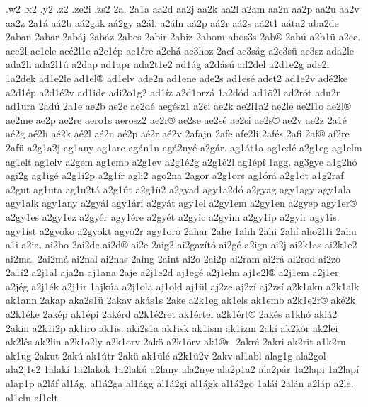 {.w2
.x2
.y2
.z2
.ze2i
.zs2
2a.
2a1a
aa2d
aa2j
aa2k
aa2l
a2am
aa2n
aa2p
aa2u
aa2v
aa2z
2a1^^e1
a^^e12b
a^^e12gak
a^^e12gy
a2^^e1l.
a2^^e1ln
a^^e12p
a^^e12r
a^^e12s
a^^e12t1
a^^e1ta2
aba2de
2aban
2abar
2ab^^e1j
2ab^^e1z
2abes
2abir
2abiz
2abom
abos3s
2ab^^ae
2ab^^fa
a2b1^^fc
a2ce.
ace2l
ac1ele
ac^^e92l1e
a2c1^^e9p
ac1^^e9re
a2ch^^e1
ac3hoz
2ac^^ed
ac3s^^e1g
a2c3s^^fc
ac3sz
ada2le
ada2li
ada2l1^^fa
a2dap
ad1apr
ada2t1e2
ad1^^e1g
a2d^^e1s^^fa
ad2del
a2d1e2g
ade2i
1a2dek
ad1e2le
ad1el^^ae
ad1elv
ade2n
ad1ene
ade2s
ad1es^^e9
adet2
ad1e2v
ad^^e92ke
a2d1^^e9p
a2d1^^e92v
ad1ide
adi2o1g2
ad1^^edz
a2d1orz^^e1
1a2d^^f3d
ad1^^f62l
ad2r^^f3t
adu2r
ad1ura
2ad^^fa
2a1e
ae2b
ae2c
ae2d^^e9
aeg^^e9sz1
a2ei
ae2k
ae2l1a2
ae2le
ae2l1o
ae2l^^ae
ae2me
ae2p
ae2re
aero1s
aerosz2
ae2r^^ae
ae2se
ae2s^^e9
ae2si
ae2s^^ae
ae2v
ae2z
2a1^^e9
a^^e92g
a^^e92h
a^^e92k
a^^e92l
a^^e92n
a^^e92p
a^^e92r
a^^e92v
2afajn
2afe
afe2li
2af^^e9s
2afi
2af^^ae
af2re
2af^^fc
a2g1a2j
ag1any
ag1arc
ag^^e1n1n
ag^^e12ny^^e9
a2g^^e1r.
ag1^^e1t1a
ag1ed^^e9
a2g1eg
ag1elm
ag1elt
ag1elv
a2gem
ag1emb
a2g1ev
a2g1^^e92g
a2g1^^e92l
ag1^^e9p^^ed
1agg.
ag3gye
a1g2h^^f3
agi2g
ag1ig^^e9
a2g1i2p
a2g1^^edr
agli2
ago2na
2agor
a2g1ors
ag1^^f3r^^e1
a2g1^^f6t
a1g2raf
a2gut
ag1uta
ag1u2t^^e1
a2g1^^fat
a2g1^^fc2
a2gyad
agy1a2d^^f3
a2gyag
agy1agy
agy1ala
agy1alk
agy1any
a2gy^^e1l
agy1^^e1ri
a2gy^^e1t
agy1el
a2gy1em
a2gy1en
a2gyep
agy1er^^ae
a2gy1es
a2gy1ez
a2gy^^e9r
agy1^^e9re
a2gy^^e9t
a2gyic
a2gyim
a2gy1ip
a2gyir
agy1is.
agy1ist
a2gyoko
a2gyokt
agyo2r
agy1oro
2ahar
2ahe
1ahh
2ahi
2ah^^ed
aho2l1i
2ahu
a1i
a2ia.
ai2bo
2ai2de
ai2d^^ae
ai2e
2aig2
ai2gaz^^edt^^f3
ai2g^^e9
a2ign
ai2j
ai2k1as
ai2k1e2
ai2ma.
2ai2m^^e1
ai2nal
ai2nas
2aing
2aint
ai2o
2ai2p
ai2ram
ai2r^^e1
ai2rod
ai2zo
2a1^^ed2
a2j1al
aja2n
aj1ana
2aje
a2j1e2d
aj1eg^^e9
a2j1elm
aj1e2l^^ae
a2j1em
a2j1er
a2j^^e9g
a2j1^^e9k
a2j1ir
1ajk^^faa
a2j1ola
aj1old
aj1^^fcl
aj2ze
aj2z^^ed
aj2zs^^ed
a2k1akn
a2k1alk
ak1ann
2akap
aka2s1^^fc
2akav
ak^^e1s1s
2ake
a2k1eg
ak1els
ak1emb
a2k1e2r^^ae
ak^^e92k
a2k1^^e9ke
2ak^^e9p
ak1^^e9p^^ed
2ak^^e9rd
a2k1^^e92ret
ak1^^e9rtel
a2k1^^e9rt^^ae
2ak^^e9s
a1kh^^f3
aki^^e12
2akin
a2k1i2p
ak1iro
ak1is.
aki2s1a
ak1isk
ak1ism
ak1izm
2ak^^ed
ak2k^^f3r
ak2lei
ak2l^^e9s
ak2lin
a2k1o2ly
a2k1orv
2ak^^f6
a2k1^^f6rv
ak1^^aer.
2akr^^e9
2akri
ak2rit
a1k2ru
ak1ug
2akut
2ak^^fa
ak1^^fatr
2ak^^fc
ak1^^fcl^^e9
a2k1^^fc2v
2akv
al1abl
alag1g
ala2gol
ala2j1e2
1alak^^ed
1a2lakok
1a2lak^^fa
a2lany
ala2nye
ala2p1a2
ala2p^^e1r
1a2lapi
1a2lap^^ed
alap1p
a2l^^e1f
al1^^e1g.
al1^^e12ga
al1^^e1gg
al1^^e12gi
al1^^e1gk
al1^^e12go
1al^^e1^^ed
2al^^e1n
a2l^^e1p
a2le.
al1eln
al1elt
}
